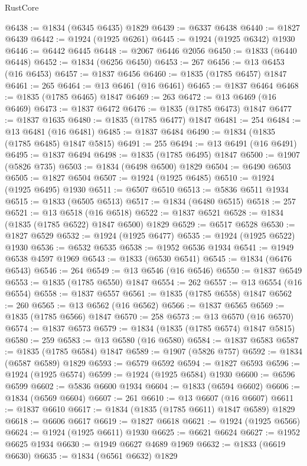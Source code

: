 \begin{lexlean}{RustCore}
\begin{coremodule}
@6438 := @1834 (@6345 @6435) @1829
@6439 := @6337 @6438
@6440 := @1827 @6439
@6442 := @1924 (@1925 @6261)
@6445 := @1924 (@1925 @6342) @1930
@6446 := @6442 @6445
@6448 := @2067 @6446 @2056
@6450 := @1833 (@6440 @6448)
@6452 := @1834 (@6256 @6450)
@6453 := 267
@6456 := @13 @6453 (@16 @6453)
@6457 := @1837 @6456
@6460 := @1835 (@1785 @6457) @1847
@6461 := 265
@6464 := @13 @6461 (@16 @6461)
@6465 := @1837 @6464
@6468 := @1835 (@1785 @6465) @1847
@6469 := 263
@6472 := @13 @6469 (@16 @6469)
@6473 := @1837 @6472
@6476 := @1835 (@1785 @6473) @1847
@6477 := @1837 @1635
@6480 := @1835 (@1785 @6477) @1847
@6481 := 254
@6484 := @13 @6481 (@16 @6481)
@6485 := @1837 @6484
@6490 := @1834 (@1835 (@1785 @6485) @1847 @5815)
@6491 := 255
@6494 := @13 @6491 (@16 @6491)
@6495 := @1837 @6494
@6498 := @1835 (@1785 @6495) @1847
@6500 := @1907 (@5826 @735)
@6503 := @1834 (@6498 @6500) @1829
@6504 := @6490 @6503
@6505 := @1827 @6504
@6507 := @1924 (@1925 @6485)
@6510 := @1924 (@1925 @6495) @1930
@6511 := @6507 @6510
@6513 := @5836 @6511 @1934
@6515 := @1833 (@6505 @6513)
@6517 := @1834 (@6480 @6515)
@6518 := 257
@6521 := @13 @6518 (@16 @6518)
@6522 := @1837 @6521
@6528 := @1834 (@1835 (@1785 @6522) @1847 @6500) @1829
@6529 := @6517 @6528
@6530 := @1827 @6529
@6532 := @1924 (@1925 @6477)
@6535 := @1924 (@1925 @6522) @1930
@6536 := @6532 @6535
@6538 := @1952 @6536 @1934
@6541 := @1949 @6538 @4597 @1969
@6543 := @1833 (@6530 @6541)
@6545 := @1834 (@6476 @6543)
@6546 := 264
@6549 := @13 @6546 (@16 @6546)
@6550 := @1837 @6549
@6553 := @1835 (@1785 @6550) @1847
@6554 := 262
@6557 := @13 @6554 (@16 @6554)
@6558 := @1837 @6557
@6561 := @1835 (@1785 @6558) @1847
@6562 := 260
@6565 := @13 @6562 (@16 @6562)
@6566 := @1837 @6565
@6569 := @1835 (@1785 @6566) @1847
@6570 := 258
@6573 := @13 @6570 (@16 @6570)
@6574 := @1837 @6573
@6579 := @1834 (@1835 (@1785 @6574) @1847 @5815)
@6580 := 259
@6583 := @13 @6580 (@16 @6580)
@6584 := @1837 @6583
@6587 := @1835 (@1785 @6584) @1847
@6589 := @1907 (@5826 @757)
@6592 := @1834 (@6587 @6589) @1829
@6593 := @6579 @6592
@6594 := @1827 @6593
@6596 := @1924 (@1925 @6574)
@6599 := @1924 (@1925 @6584) @1930
@6600 := @6596 @6599
@6602 := @5836 @6600 @1934
@6604 := @1833 (@6594 @6602)
@6606 := @1834 (@6569 @6604)
@6607 := 261
@6610 := @13 @6607 (@16 @6607)
@6611 := @1837 @6610
@6617 := @1834 (@1835 (@1785 @6611) @1847 @6589) @1829
@6618 := @6606 @6617
@6619 := @1827 @6618
@6621 := @1924 (@1925 @6566)
@6624 := @1924 (@1925 @6611) @1930
@6625 := @6621 @6624
@6627 := @1952 @6625 @1934
@6630 := @1949 @6627 @4689 @1969
@6632 := @1833 (@6619 @6630)
@6635 := @1834 (@6561 @6632) @1829

\end{coremodule}
\end{lexlean}
